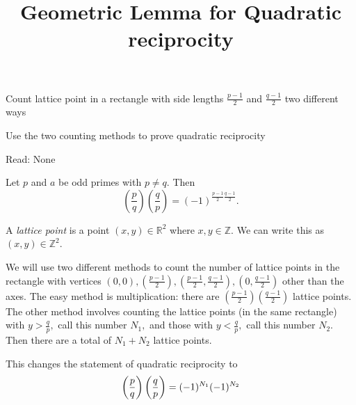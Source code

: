 \documentclass{ximera}
\title{Geometric Lemma for Quadratic reciprocity}
\begin{document}
\begin{abstract}
\end{abstract}
\maketitle


\begin{obj}
    \item Count lattice point in a rectangle with side lengths $\frac{p-1}{2}$ and $\frac{q-1}{2}$ two different ways
	\item Use the two counting methods to prove quadratic reciprocity
\end{obj}


\begin{pre}
    \item[Read:] None
\end{pre}


\begin{theorem}
	Let $p$ and $a$ be odd primes with $p\neq q$. Then \[\left(\frac{p}{q}\right)\left(\frac{q}{p}\right)=(-1)^{\frac{p-1}{2}\frac{q-1}{2}}.\]
\end{theorem}
	
\begin{definition}
	A \emph{lattice point} is a point $(x,y)\in\mathbb{R}^2$ where $x,y\in\mathbb{Z}$. We can write this as $(x,y)\in\mathbb{Z}^2$.
\end{definition}

We will use two different methods to count the number of lattice points in the rectangle with vertices $(0,0), \left(\tfrac{p-1}{2}\right),\left(\tfrac{p-1}{2},\tfrac{q-1}{2}\right), \left(0,\tfrac{q-1}{2}\right)$ other than the axes.  The easy method is multiplication: 
there are $\left(\tfrac{p-1}{2}\right)\left(\tfrac{q-1}{2}\right)$ lattice points. The other method involves counting the lattice points (in the same rectangle) with $y>\tfrac{q}{p},$ call this number $N_1,$ and those with $y<\tfrac{q}{p},$ call this number $N_2.$ Then there are a total of $N_1+N_2$ lattice points. 

This changes the statement of quadratic reciprocity to \[\left(\frac{p}{q}\right)\left(\frac{q}{p}\right)=(-1)^{N_1}(-1)^{N_2}\]


        
\end{document}
